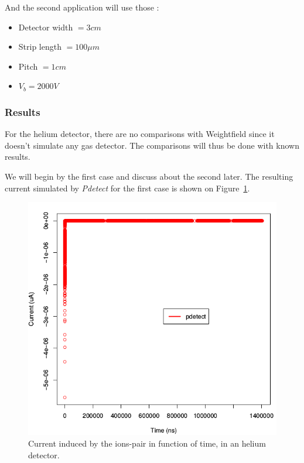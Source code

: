 \documentclass[11pt]{article}
\begin{document}
			And the second application will use those :

			\begin{itemize}

				\item Detector width $= 3 cm$
				\item Strip length $= 100 \mu m$
				\item Pitch $= 1 cm$
				\item $V_b = 2000 V$

			\end{itemize}

		\subsubsection*{Results}

			For the helium detector, there are no comparisons with Weightfield since it doesn't simulate
			any gas detector. The comparisons will thus be done with known results.

			We will begin by the first case and discuss about the second later.
			The resulting current simulated by \textit{Pdetect} for the first case is shown on 
			Figure~\ref{fig:helium1_unprecise}.

			\begin{figure}[H]
			  \center
			  \includegraphics[scale=0.5]{images/applications/helium1_unprecise.png}
			  \caption{Current induced by the ions-pair in function of time, in an helium detector.}
			  \label{fig:helium1_unprecise}
			\end{figure}
\end{document}
